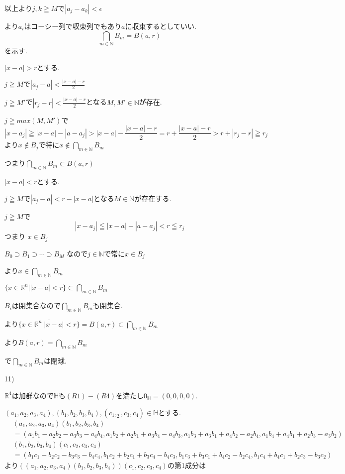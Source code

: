 \documentclass{jsarticle}
\begin{document}
以上より$j,k\geqq M$で$|a_j-a_k| < \epsilon$

より$a_i$はコーシー列で収束列でもあり$a$に収束するとしていい.
\[\bigcap_{m\in\mathbb{N}}B_m=B(a,r)\]
を示す.

$|x-a|>r$とする.

$j\geqq M$で$|a_j-a|<\frac{|x-a|-r}{2}$

$j\geqq M'$で$|r_j-r|<\frac{|x-a|-r}{2}$となる$M,M'\in\mathbb{N}$が存在.

$j\geqq max(M,M')$で
\[|x-a_j|\geqq |x-a|-|a-a_j|>|x-a|-\frac{|x-a|-r}{2}
= r + \frac{|x-a|-r}{2} > r + |r_j-r| \geqq r_j
\]
より$x\notin B_j$で特に$\displaystyle x\notin \bigcap_{m\in\mathbb{N}}B_m$

つまり$\displaystyle \bigcap_{m\in\mathbb{N}}B_m\subset B(a,r)$

$|x-a|<r$とする.

$j\geqq M$で$|a_j-a|<r - |x-a|$となる$M\in\mathbb{N}$が存在する.

$j\geqq M$で
\[|x-a_j| \leqq |x-a|-|a-a_j|<r\leqq r_j\]
つまり
$x\in B_j$

$B_0\supset B_1 \supset \cdots \supset B_M $ なので$j\in\mathbb{N}$で常に$x\in B_j$

より$\displaystyle x\in \bigcap_{m\in\mathbb{N}}B_m$

$\displaystyle \{x\in\mathbb{R}^n| |x-a|<r\}\subset \bigcap_{m\in\mathbb{N}}B_m$

$B_i$は閉集合なので$\displaystyle \bigcap_{m\in\mathbb{N}}B_m$も閉集合.

より$\displaystyle \overline{\{x\in\mathbb{R}^n| |x-a|<r\}} = B(a,r) \subset \bigcap_{m\in\mathbb{N}}B_m$

より$\displaystyle B(a,r) = \bigcap_{m\in\mathbb{N}}B_m$

で$\displaystyle \bigcap_{m\in\mathbb{N}}B_m$は閉球.

11)

$\mathbb{R}^4$は加群なので$\mathbb{H}$も$(R1)-(R4)$を満たし$0_\mathbb{H}=(0,0,0,0)$.

$(a_1,a_2,a_3,a_4),(b_1,b_2,b_3,b_4),(c_1,_2,c_3,c_4)\in\mathbb{H}$とする.
\begin{align*}
&(a_1,a_2,a_3,a_4)(b_1,b_2,b_3,b_4) \\
&= (a_1b_1-a_2b_2-a_3b_3-a_4b_4,a_1b_2+a_2b_1+a_3b_4-a_4b_3,a_1b_3+a_3b_1+a_4b_2-a_2b_4,a_1b_4+a_4b_1+a_2b_3-a_3b_2)\end{align*}
\begin{align*}
&(b_1,b_2,b_3,b_4)(c_1,c_2,c_3,c_4) \\
&= (b_1c_1-b_2c_2-b_3c_3-b_4c_4,b_1c_2+b_2c_1+b_3c_4-b_4c_3,b_1c_3+b_3c_1+b_4c_2-b_2c_4,b_1c_4+b_4c_1+b_2c_3-b_3c_2)\end{align*}
より$((a_1,a_2,a_3,a_4)(b_1,b_2,b_3,b_4))(c_1,c_2,c_3,c_4)$の第1成分は
\end{document}
